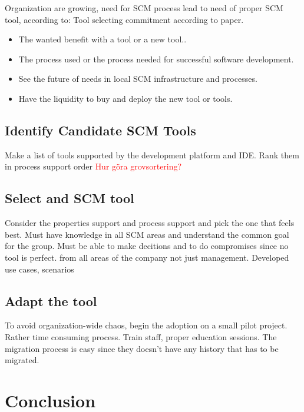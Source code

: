 \documentclass[10pt]{article}
\newcommand\remove[1]{\textcolor{red}{#1}}
\begin{document}
Organization are growing, need for SCM process lead to need of proper SCM tool,  according to: 
Tool selecting commitment according to paper. 
\begin{itemize}
\item The wanted benefit with a tool or a new tool..
\item The process used or the process needed for successful software development.
\item See the future of needs in local SCM infrastructure and processes.
\item Have the liquidity to buy and deploy the new tool or tools.
\end{itemize}

\subsection{Identify Candidate SCM Tools}
Make a list of tools supported by the development platform and IDE. Rank them in process support order \remove{Hur göra grovsortering?}

\subsection{Select and SCM tool}
Consider the properties support and process support and pick the one that feels best.
Must have knowledge in all SCM areas and understand the common goal for the group.
Must be able to make decitions and to do compromises since no tool is perfect. from all areas of the company not just management.
Developed use cases, scenarios

\subsection{Adapt the tool}
To avoid organization-wide chaos, begin the adoption on a small pilot project. Rather time consuming process.
Train staff, proper education sessions.
The migration process is easy since they doesn't have any history that has to be migrated.

\section{Conclusion}
\end{document}
